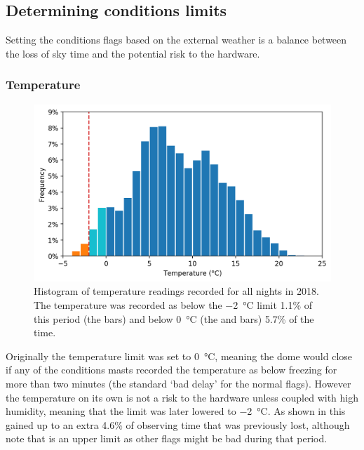 \subsection{Determining conditions limits}
\label{sec:conditions_limits}
\begin{colsection}

Setting the conditions flags based on the external weather is a balance between the loss of sky time and the potential risk to the hardware.

\subsubsection{Temperature}

\begin{figure}[t]
    \begin{center}
        \includegraphics[width=\linewidth]{images/conditions/temperature.png}
    \end{center}
    \caption[Histogram of temperature readings]{
        Histogram of temperature readings recorded for all nights in 2018. The temperature was recorded as below the \SI{-2}{\celsius} limit 1.1\% of this period (the  bars) and below \SI{0}{\celsius} (the  and  bars) 5.7\% of the time.
    }\label{fig:temperature}
\end{figure}

Originally the temperature limit was set to \SI{0}{\celsius}, meaning the dome would close if any of the conditions masts recorded the temperature as below freezing for more than two minutes (the standard `bad delay' for the normal flags). However the temperature on its own is not a risk to the hardware unless coupled with high humidity, meaning that the limit was later lowered to \SI{-2}{\celsius}. As shown in  this gained up to an extra 4.6\% of observing time that was previously lost, although note that is an upper limit as other flags might be bad during that period.


\end{colsection}
